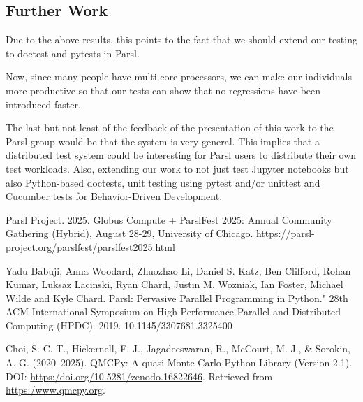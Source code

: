\subsection{Further Work}

Due to the above results, this points to the fact that we should extend our testing to doctest and pytests in Parsl.

Now, since many people have multi-core processors, we can make our individuals more productive so that our tests can show that no regressions have been introduced faster.

The last but not least of the feedback of the presentation of this work to the Parsl group would be that the system is very general. This implies that a distributed test system could be interesting for Parsl users to distribute their own test workloads. 
Also, extending our work to not just test Jupyter notebooks but also Python-based doctests, unit testing using pytest and/or unittest and Cucumber tests for Behavior-Driven Development.


\begin{thebibliography}{6}

Parsl Project. 2025. Globus Compute + ParslFest 2025: Annual Community Gathering (Hybrid), August 28-29, University of Chicago. https://parsl-project.org/parslfest/parslfest2025.html

Yadu Babuji, Anna Woodard, Zhuozhao Li, Daniel S. Katz, Ben Clifford, Rohan Kumar, Luksaz Lacinski, Ryan Chard, Justin M. Wozniak, Ian Foster, Michael Wilde and Kyle Chard. Parsl: Pervasive Parallel Programming in Python." 28th ACM International Symposium on High-Performance Parallel and Distributed Computing (HPDC). 2019. 10.1145/3307681.3325400

Choi, S.-C. T., Hickernell, F. J., Jagadeeswaran, R., McCourt, M. J., \& Sorokin, A. G. (2020--2025).
QMCPy: A quasi-Monte Carlo Python Library (Version 2.1).
DOI: \url{https:/doi.org/10.5281/zenodo.16822646}. 
Retrieved from \url{https:/www.qmcpy.org}.



\end{thebibliography}
